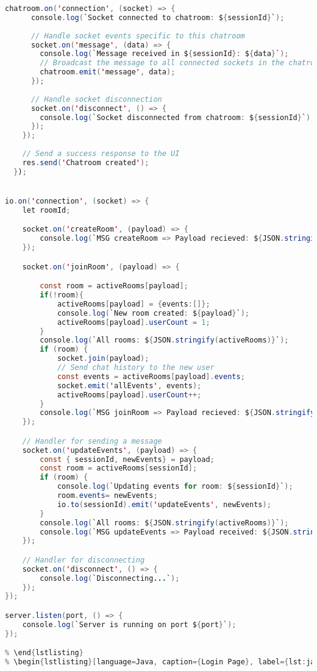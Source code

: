 \begin{lstlisting}[language=Java, caption={Express Backend server}, label={lst:java}]
    chatroom.on('connection', (socket) => {
      console.log(`Socket connected to chatroom: ${sessionId}`);
  
      // Handle socket events specific to this chatroom
      socket.on('message', (data) => {
        console.log(`Message received in ${sessionId}: ${data}`);
        // Broadcast the message to all connected sockets in the chatroom
        chatroom.emit('message', data);
      });
  
      // Handle socket disconnection
      socket.on('disconnect', () => {
        console.log(`Socket disconnected from chatroom: ${sessionId}`);
      });
    });
  
    // Send a success response to the UI
    res.send('Chatroom created');
  });


io.on('connection', (socket) => {
    let roomId;

    socket.on('createRoom', (payload) => {
        console.log(`MSG createRoom => Payload recieved: ${JSON.stringify(payload)}`);
    });

    socket.on('joinRoom', (payload) => {

        const room = activeRooms[payload];
        if(!room){
            activeRooms[payload] = {events:[]};
            console.log(`New room created: ${payload}`);
            activeRooms[payload].userCount = 1;
        }
        console.log(`All rooms: ${JSON.stringify(activeRooms)}`);
        if (room) {
            socket.join(payload);
            // Send chat history to the new user
            const events = activeRooms[payload].events;
            socket.emit('allEvents', events);
            activeRooms[payload].userCount++;
        }
        console.log(`MSG joinRoom => Payload recieved: ${JSON.stringify(payload)}`);
    });

    // Handler for sending a message
    socket.on('updateEvents', (payload) => {
        const { sessionId, newEvents} = payload;
        const room = activeRooms[sessionId];
        if (room) {
            console.log(`Updating events for room: ${sessionId}`);
            room.events= newEvents;
            io.to(sessionId).emit('updateEvents', newEvents);
        }
        console.log(`All rooms: ${JSON.stringify(activeRooms)}`);
        console.log(`MSG updateEvents => Payload received: ${JSON.stringify(payload)}`);
    });

    // Handler for disconnecting
    socket.on('disconnect', () => {
        console.log(`Disconnecting...`);
    });
});

server.listen(port, () => {
    console.log(`Server is running on port ${port}`);
});

% \end{lstlisting}
\end{lstlisting}
